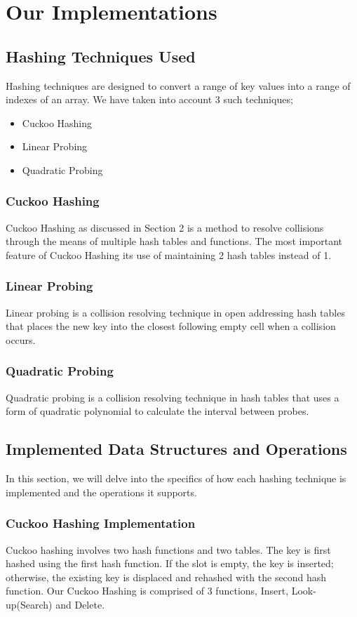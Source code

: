\documentclass[12pt]{article}
\begin{document}
\section{Our Implementations}
\subsection{Hashing Techniques Used}
Hashing techniques are designed to convert a range of key values into a range of indexes of an array. We have taken into account 3 such techniques; 
\begin{itemize}
    \item Cuckoo Hashing
    \item Linear Probing
    \item Quadratic Probing
\end{itemize}


\subsubsection{Cuckoo Hashing}
Cuckoo Hashing as discussed in Section 2 is a method to resolve collisions through the means of multiple hash tables and functions. The most important feature of Cuckoo Hashing its use of maintaining 2 hash tables instead of 1.


\subsubsection{Linear Probing}
Linear probing is a collision resolving technique in open addressing hash tables that places the new key into the closest following empty cell when a collision occurs.


\subsubsection{Quadratic Probing}
Quadratic probing is a collision resolving technique in hash tables that uses a form of quadratic polynomial to calculate the interval between probes.


\subsection{Implemented Data Structures and Operations}
In this section, we will delve into the specifics of how each hashing technique is implemented and the operations it supports.

\subsubsection{Cuckoo Hashing Implementation}
Cuckoo hashing involves two hash functions and two tables. The key is first hashed using the first hash function. If the slot is empty, the key is inserted; otherwise, the existing key is displaced and rehashed with the second hash function.
Our Cuckoo Hashing is comprised of 3 functions, Insert, Look-up(Search) and Delete.
\end{document}
